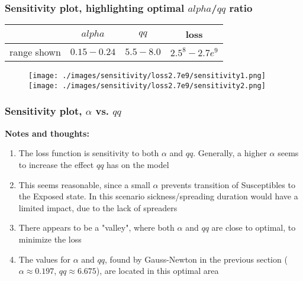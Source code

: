 \documentclass{beamer}
\begin{document}
\begin{frame}
	\frametitle{Sensitivity plot, highlighting optimal $alpha$/$qq$ ratio}
	\begin{center}
		\begin{tabular}{|c|c|c|c|}
			\hline & $alpha$ & $qq$ & loss \\
			\hline range shown & $0.15-0.24$ & $5.5-8.0$ & $2.5^{8}-2.7e^{9}$\\
			\hline
		\end{tabular}
		\begin{figure}
				\hspace{-1.4cm}
				\texttt{[image: ./images/sensitivity/loss2.7e9/sensitivity1.png]}\hspace{-1cm}%
				\texttt{[image: ./images/sensitivity/loss2.7e9/sensitivity2.png]}
		\end{figure}
	\end{center}
\end{frame}

\begin{frame}
	\frametitle{Sensitivity plot, $\alpha$ vs. $qq$}
	\textbf{Notes and thoughts:}
	\begin{enumerate}[$\bullet$]
		\item The loss function is sensitivity to both $\alpha$ and $qq$. Generally, a higher $\alpha$
			seems to increase the effect $qq$ has on the model
		\item This seems reasonable, since a small $\alpha$ prevents transition of Susceptibles to the Exposed state. In this scenario
			sickness/spreading duration would have a limited impact, due to the lack of spreaders
		\item There appears to be a "valley", where both $\alpha$ and $qq$ are close to optimal, to minimize the loss
		\item The values for $\alpha$ and $qq$, found by Gauss-Newton in the previous section ($\alpha \approx 0.197$, $qq \approx 6.675$),
			are located in this optimal area
	\end{enumerate}
\end{frame}

\end{document}
